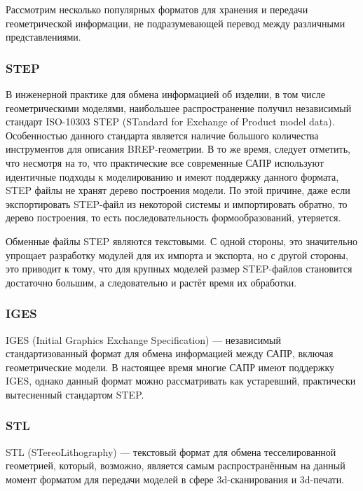 Рассмотрим несколько популярных форматов для хранения и передачи геометрической информации, не подразумевающей перевод между различными представлениями.

\subsubsection{STEP}\label{sec:secSTEP}

В инженерной практике для обмена информацией об изделии, в том числе геометрическими моделями, наибольшее распространение получил независимый стандарт ISO-10303 STEP (STandard for Exchange of Product model data).
Особенностью данного стандарта является наличие большого количества инструментов для описания BREP-геометрии. В то же время, следует отметить, что несмотря на то, что практические все современные САПР используют идентичные подходы к моделированию и имеют поддержку данного формата, STEP файлы не хранят дерево построения модели. По этой причине, даже если экспортировать STEP-файл из некоторой системы и импортировать обратно, то дерево построения, то есть последовательность формообразований, утеряется.

Обменные файлы STEP являются текстовыми. С одной стороны, это значительно упрощает разработку модулей для их импорта и экспорта, но с другой стороны, это приводит к тому, что для крупных моделей размер STEP-файлов становится достаточно большим, а следовательно и растёт время их обработки.

\subsubsection{IGES}\label{sec:secIGES}

IGES (Initial Graphics Exchange Specification) --- независимый стандартизованный формат для обмена информацией между САПР, включая геометрические модели. В настоящее время многие САПР имеют поддержку IGES, однако данный формат можно рассматривать как устаревший, практически вытесненный стандартом STEP.

\subsubsection{STL}\label{sec:secSTL}

STL (STereoLithography) --- текстовый формат для обмена тесселированной геометрией, который, возможно, является самым распространённым на данный момент форматом для передачи моделей в сфере 3d-сканирования и 3d-печати.

